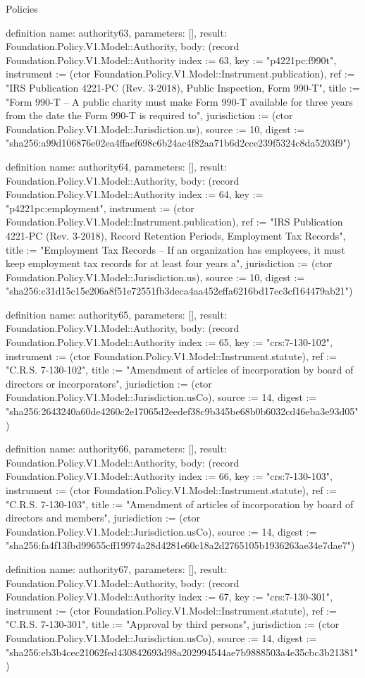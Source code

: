 \begin{lexlean}{Policies}
\begin{semanticmodule}
definition{
  name: authority63,
  parameters: [],
  result: Foundation.Policy.V1.Model::Authority,
  body: (record Foundation.Policy.V1.Model::Authority {index := 63, key := "p4221pc:f990t", instrument := (ctor Foundation.Policy.V1.Model::Instrument.publication), ref := "IRS Publication 4221-PC (Rev. 3-2018), Public Inspection, Form 990-T", title := "Form 990-T – A public charity must make Form 990-T available for three years from the date the Form 990-T is required to", jurisdiction := (ctor Foundation.Policy.V1.Model::Jurisdiction.us), source := 10, digest := "sha256:a99d106876e02ea4ffaef698c6b24ac4f82aa71b6d2cce239f5324c8da5203f9"})
}

definition{
  name: authority64,
  parameters: [],
  result: Foundation.Policy.V1.Model::Authority,
  body: (record Foundation.Policy.V1.Model::Authority {index := 64, key := "p4221pc:employment", instrument := (ctor Foundation.Policy.V1.Model::Instrument.publication), ref := "IRS Publication 4221-PC (Rev. 3-2018), Record Retention Periods, Employment Tax Records", title := "Employment Tax Records – If an organization has employees, it must keep employment tax records for at least four years a", jurisdiction := (ctor Foundation.Policy.V1.Model::Jurisdiction.us), source := 10, digest := "sha256:c31d15c15e206a8f51e72551fb3deca4aa452effa6216bd17ec3cf164479ab21"})
}

definition{
  name: authority65,
  parameters: [],
  result: Foundation.Policy.V1.Model::Authority,
  body: (record Foundation.Policy.V1.Model::Authority {index := 65, key := "crs:7-130-102", instrument := (ctor Foundation.Policy.V1.Model::Instrument.statute), ref := "C.R.S. 7-130-102", title := "Amendment of articles of incorporation by board of directors or incorporators", jurisdiction := (ctor Foundation.Policy.V1.Model::Jurisdiction.usCo), source := 14, digest := "sha256:2643240a60de4260c2e17065d2eedef38c9b345be68b0b6032cd46eba3e93d05"})
}

definition{
  name: authority66,
  parameters: [],
  result: Foundation.Policy.V1.Model::Authority,
  body: (record Foundation.Policy.V1.Model::Authority {index := 66, key := "crs:7-130-103", instrument := (ctor Foundation.Policy.V1.Model::Instrument.statute), ref := "C.R.S. 7-130-103", title := "Amendment of articles of incorporation by board of directors and members", jurisdiction := (ctor Foundation.Policy.V1.Model::Jurisdiction.usCo), source := 14, digest := "sha256:fa4f13fbd99655cff19974a28d4281e60c18a2d2765105b1936263ae34e7dae7"})
}

definition{
  name: authority67,
  parameters: [],
  result: Foundation.Policy.V1.Model::Authority,
  body: (record Foundation.Policy.V1.Model::Authority {index := 67, key := "crs:7-130-301", instrument := (ctor Foundation.Policy.V1.Model::Instrument.statute), ref := "C.R.S. 7-130-301", title := "Approval by third persons", jurisdiction := (ctor Foundation.Policy.V1.Model::Jurisdiction.usCo), source := 14, digest := "sha256:eb3b4cec21062fed430842693d98a202994544ae7b9888503a4e35cbc3b21381"})
}


\end{semanticmodule}
\end{lexlean}
